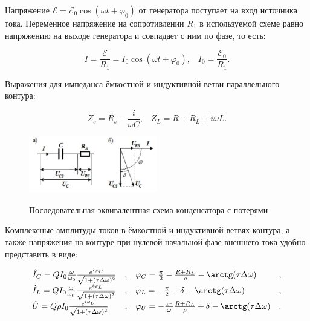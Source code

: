 \documentclass[a4paper,12pt]{article}
\begin{document}
Напряжение $\mathcal{E} = \mathcal{E}_0 \cos (\omega t + \varphi_0)$ от генератора поступает на вход источника тока. Переменное напряжение на сопротивлении $R_1$ в используемой схеме равно напряжению на выходе генератора и совпадает с ним по фазе, то есть:

\begin{equation}
I = \frac{\mathcal{E}}{R_1} = I_0 \cos (\omega t + \varphi_0), \;\;\; I_0 = \frac{\mathcal{E}_0}{R_1}.
\end{equation}

\noindent Выражения для импеданса ёмкостной и индуктивной ветви параллельного контура:

\begin{equation}
Z_c = R_s - \frac{i}{\omega C}, \;\;\; Z_L = R + R_L + i\omega L.
\end{equation}

\begin{figure}
\centering
\includegraphics[width=0.5\textwidth]{setup2.png}\
\caption{Последовательная эквивалентная схема конденсатора с потерями}
\end{figure}

Комплексные амплитуды токов в ёмкостной и индуктивной ветвях контура, а также напряжения на контуре при нулевой начальной фазе внешнего тока удобно представить в виде:

\begin{equation}
\begin{array}{llll}
\hat{I}_C = QI_0 \frac{\omega}{\omega_0}\frac{e^{i \varphi_C}}{\sqrt{1 + (\tau \Delta \omega)^2}}
&
, 
&
\varphi_C = \frac{\pi}{2} - \frac{R + R_L}{\rho} - \arctg (\tau \Delta \omega)
&
,
\\
\hat{I}_L = QI_0 \frac{\omega}{\omega_0}\frac{e^{i \varphi_L}}{\sqrt{1 + (\tau \Delta \omega)^2}}&
, 
&
\varphi_L = - \frac{\pi}{2} + \delta - \arctg (\tau \Delta \omega)
&
,
\\	
\hat{U} = Q\rho I_0 \frac{e^{i \varphi_U}}{\sqrt{1 + (\tau \Delta \omega)^2}}
&
, 
&
\varphi_U = - \frac{\omega_0}{\omega} \frac{R + R_L}{\rho} + \delta - \arctg (\tau \Delta \omega)
&
.
\\	
\end{array}
\end{equation}
\end{document}
